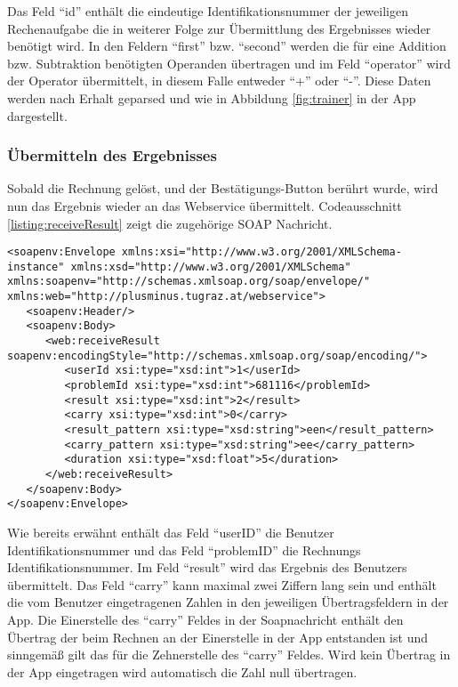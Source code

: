 Das Feld \enquote{id} enthält die eindeutige Identifikationsnummer der jeweiligen Rechenaufgabe die 
in weiterer Folge zur Übermittlung des Ergebnisses wieder benötigt wird. In den 
Feldern \enquote{first} bzw. \enquote{second} werden die für eine Addition bzw. Subtraktion benötigten 
Operanden übertragen und im Feld \enquote{operator} wird der Operator übermittelt, in diesem Falle entweder
\enquote{+} oder \enquote{-}. Diese Daten werden nach Erhalt geparsed und wie in Abbildung \ref{fig:trainer} in der App dargestellt.

\subsubsection{Übermitteln des Ergebnisses}
Sobald die Rechnung gelöst, und der Bestätigungs-Button berührt wurde, wird nun das Ergebnis wieder an das 
Webservice übermittelt. Codeausschnitt \ref{listing:receiveResult} zeigt die zugehörige SOAP Nachricht.
\begin{lstlisting}[caption=Übermitteln des Resultats, label=listing:receiveResult]
<soapenv:Envelope xmlns:xsi="http://www.w3.org/2001/XMLSchema-instance" xmlns:xsd="http://www.w3.org/2001/XMLSchema" xmlns:soapenv="http://schemas.xmlsoap.org/soap/envelope/" xmlns:web="http://plusminus.tugraz.at/webservice">
   <soapenv:Header/>
   <soapenv:Body>
      <web:receiveResult soapenv:encodingStyle="http://schemas.xmlsoap.org/soap/encoding/">
         <userId xsi:type="xsd:int">1</userId>
         <problemId xsi:type="xsd:int">681116</problemId>
         <result xsi:type="xsd:int">2</result>
         <carry xsi:type="xsd:int">0</carry>
         <result_pattern xsi:type="xsd:string">een</result_pattern>
         <carry_pattern xsi:type="xsd:string">ee</carry_pattern>
         <duration xsi:type="xsd:float">5</duration>
      </web:receiveResult>
   </soapenv:Body>
</soapenv:Envelope>
\end{lstlisting}

Wie bereits erwähnt enthält das Feld \enquote{userID} die Benutzer Identifikationsnummer und das 
Feld \enquote{problemID} die Rechnungs Identifikationsnummer. Im Feld \enquote{result} wird das
Ergebnis des Benutzers übermittelt. Das Feld \enquote{carry} kann maximal zwei Ziffern lang sein 
und enthält die vom Benutzer eingetragenen Zahlen in den jeweiligen Übertragsfeldern in der App.
Die Einerstelle des \enquote{carry} Feldes in der Soapnachricht enthält den Übertrag der beim Rechnen 
an der Einerstelle in der App entstanden ist und sinngemäß gilt das für die Zehnerstelle des \enquote{carry}
Feldes. Wird kein Übertrag in der App eingetragen wird automatisch die Zahl null übertragen.

